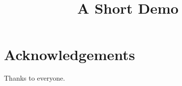 \documentclass[article]{jss}
\title{A Short Demo}
\begin{document}
\section{Acknowledgements}
Thanks to everyone.
\end{document}
